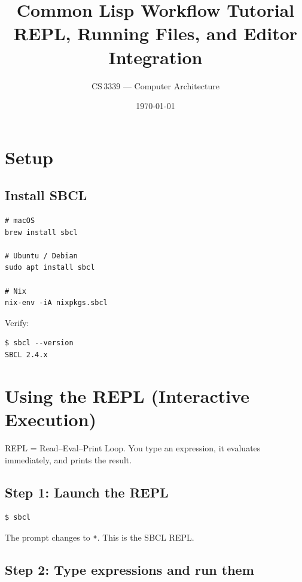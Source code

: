 \documentclass[a4paper,11pt]{article}
\title{\textbf{Common Lisp Workflow Tutorial}\\[4pt]
  \large REPL, Running Files, and Editor Integration}
\author{CS\,3339 --- Computer Architecture}
\date{\today}
\begin{document}
\maketitle
\tableofcontents
\newpage

\section{Setup}

\subsection{Install SBCL}

\begin{lstlisting}[style=shell]
# macOS
brew install sbcl

# Ubuntu / Debian
sudo apt install sbcl

# Nix
nix-env -iA nixpkgs.sbcl
\end{lstlisting}

Verify:

\begin{lstlisting}[style=shell]
$ sbcl --version
SBCL 2.4.x
\end{lstlisting}

\section{Using the REPL (Interactive Execution)}

REPL = Read--Eval--Print Loop.
You type an expression, it evaluates immediately, and prints the result.

\subsection{Step 1: Launch the REPL}

\begin{lstlisting}[style=shell]
$ sbcl
\end{lstlisting}

The prompt changes to \texttt{*}. This is the SBCL REPL.

\subsection{Step 2: Type expressions and run them}
\end{document}
